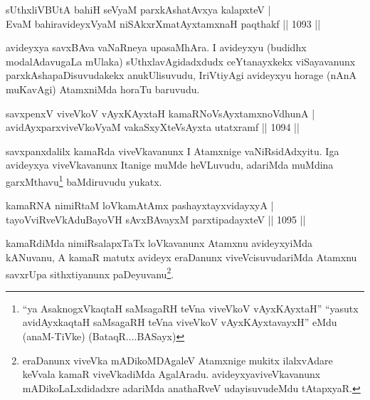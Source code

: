 
\begin{shl}
\footnotemark[2]sUthxliVBUtA bahiH seVyaM parxkAshatAvxya kalapxteV | \\
EvaM bahiravideyxVyaM niSAkxrXmatAyxtamxnaH paqthakf \hfill||  1093 ||  
\end{shl}

\begin{artha}
avideyxya savxBAva vaNaRneya upasaMhAra. I avideyxyu (budidhx modalAdavugaLa mUlaka) sUthxlavAgidadxdudx ceYtanayxkekx viSayavanunx parxkAshapaDisuvudakekx anukUlisuvudu, IriVtiyAgi avideyxyu horage (nAnA muKavAgi) AtamxniMda horaTu baruvudu.
\end{artha}

\begin{shl}
savxpenxV viveVkoV vAyxKAyxtaH kamaRNoV\s sAyx\s \s tamxnoV\s dhunA | \\
avidAyxparxviveVkoV\s yaM vakaSxyXteV\s sAyxta utatxramf \hfill||  1094 ||  
\end{shl}

\begin{artha}
savxpanxdalilx kamaRda viveVkavanunx I Atamxnige vaNiRsidAdxyitu. Iga avideyxya viveVkavanunx Itanige muMde heVLuvudu, adariMda muMdina garxMthavu\footnote{``ya AsaknogxVkaqtaH saMsagaRH teVna viveVkoV vAyxKAyxtaH'' ``yasutx avidAyxkaqtaH saMsagaRH teVna viveVkoV vAyxKAyxtavayxH'' eMdu (anaM-TiVke) (BataqR....BASayx)} baMdiruvudu yukatx.
\end{artha}


\begin{shl}
kamaRNA nimiRtaM loVkamAtAmx pashayxtayxvidayxyA | \\
tayoVviRveVkAduBayoVH sAvxBAvayxM parxtipadayxteV \hfill||  1095 ||  
\end{shl}

\begin{artha}
kamaRdiMda nimiRsalapxTaTx loVkavanunx Atamxnu avideyxyiMda kANuvanu, A kamaR matutx avideyx eraDanunx viveVcisuvudariMda Atamxnu savxrUpa sithxtiyanunx paDeyuvanu\footnote{eraDanunx viveVka mADikoMDAgaleV Atamxnige mukitx ilalxvAdare keVvala kamaR viveVkadiMda AgalAradu. avideyxyaviveVkavanunx mADikoLaLxdidadxre adariMda anathaRveV udayisuvudeMdu tAtapxyaR.}.
\end{artha}

